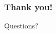 \documentclass{beamer}
\begin{document}

 \begin{frame} %
  \frametitle{Thank you!}

  \begin{center}
    \large{Questions?}   
  \end{center}    
  
 \end{frame}
\end{document}
